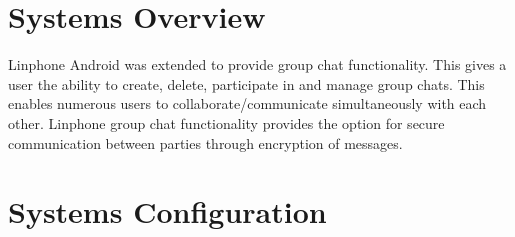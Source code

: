 \documentclass[11pt]{article}
\begin{document}


\setcounter{tocdepth}{3}
\setcounter{secnumdepth}{5}
\tableofcontents

\newpage
\section{Systems Overview}
Linphone Android was extended to provide group chat functionality. This gives a user the ability to create, delete, participate in and manage group chats. This enables numerous users to collaborate/communicate simultaneously with each other. Linphone group chat functionality provides the option for secure communication between parties through encryption of messages.

\section{Systems Configuration}

\end{document}
